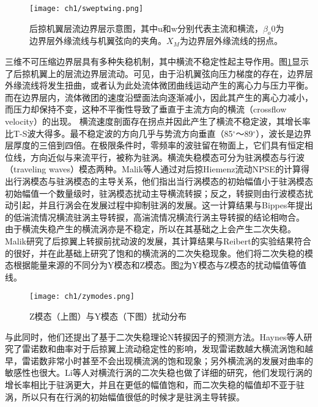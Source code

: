 \begin{figure}
  \centering
  \texttt{[image: ch1/sweptwing.png]}
  \caption{后掠机翼层流边界层示意图\cite{Aranl2000}，其中u和w分别代表主流和横流，$\beta_o0$为边界层外缘流线与机翼弦向的夹角。$X_M$为边界层外缘流线的拐点。}\label{f:sweptwing}
\end{figure}


三维不可压缩边界层具有多种失稳机制，其中横流不稳定性起主导作用。图\ref{f:sweptwing}显示了后掠机翼上的层流边界层流动。可见，由于沿机翼弦向压力梯度的存在，边界层外缘流线将发生扭曲，或者认为此处流体微团曲线运动产生的离心力与压力平衡。而在边界层内，流体微团的速度沿壁面法向逐渐减小，因此其产生的离心力减小，而压力却保持不变，这种不平衡性导致了垂直于主流方向的横流（crossflow velocity）的出现。
横流速度剖面存在拐点并因此产生了横流不稳定波，其增长率比T-S波大得多。最不稳定波的方向几乎与势流方向垂直（85$^\circ$～89$^\circ$），波长是边界层厚度的三倍到四倍\cite{Deyhle1996}。在极限条件时，零频率的波驻留在物面上，它们具有恒定相位线，方向近似与来流平行，被称为驻涡。横流失稳模态可分为驻涡模态与行波（traveling waves）模态两种。Malik等人\cite{Malik1994}通过对后掠Hiemenz流动NPSE的计算得出行涡模态与驻涡模态的主导关系，他们指出当行涡模态的初始幅值小于驻涡模态初始幅值一个数量级时，驻涡模态扰动主导横流转捩；反之，转捩则由行波模态扰动引起，并且行涡会在发展过程中抑制驻涡的发展。这一计算结果与Bippes\cite{Bippes1991}年提出的低湍流情况横流驻涡主导转捩，高湍流情况横流行涡主导转捩的结论相吻合。
由于横流失稳产生的横流涡亦是不稳定，所以在其基础之上会产生二次失稳。Malik\cite{Malik1999}研究了后掠翼上转捩前扰动波的发展，其计算结果与Reibert\cite{Reiberit1996}的实验结果符合的很好，并在此基础上研究了饱和的横流涡的二次失稳现象。他们将二次失稳的模态根据能量来源的不同分为Y模态和Z模态。图\ref{f:yzmodes}为Y模态与Z模态的扰动幅值等值线。
\begin{figure}
  \centering
  \texttt{[image: ch1/zymodes.png]}
  \caption{Z模态（上图）与Y模态（下图）扰动分布\cite{Malik1999}}\label{f:yzmodes}
\end{figure}
与此同时，他们还提出了基于二次失稳理论N转捩因子的预测方法。Haynes\cite{Haynes2000}等人研究了雷诺数和曲率对于后掠翼上流动稳定性的影响，发现雷诺数越大横流涡饱和越早，雷诺数非常小时甚至不会出现横流涡的饱和现象；另外横流涡的发展对曲率的敏感性也很大。Li\cite{Li2014}等人对横流行涡的二次失稳也做了详细的研究，他们发现行涡的增长率相比于驻涡更大，并且在更低的幅值饱和，而二次失稳的幅值却不亚于驻涡，所以只有在行涡的初始幅值很低的时候才是驻涡主导转捩。

